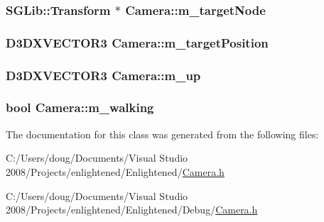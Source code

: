 \hypertarget{class_feisty_1_1_camera_ae903d3ca5f7b7a39409b5f93260540b0}{
\subsubsection[{m\_\-targetNode}]{\setlength{\rightskip}{0pt plus 5cm}SGLib::Transform $\ast$ {\bf Camera::m\_\-targetNode}}}
\label{class_feisty_1_1_camera_ae903d3ca5f7b7a39409b5f93260540b0}
\hypertarget{class_feisty_1_1_camera_a46e0e07b73df0dac52e8dea78f8a931b}{
\subsubsection[{m\_\-targetPosition}]{\setlength{\rightskip}{0pt plus 5cm}D3DXVECTOR3 {\bf Camera::m\_\-targetPosition}}}
\label{class_feisty_1_1_camera_a46e0e07b73df0dac52e8dea78f8a931b}
\hypertarget{class_feisty_1_1_camera_aa5b229f3392f3ad3f9863fdb4965288a}{
\subsubsection[{m\_\-up}]{\setlength{\rightskip}{0pt plus 5cm}D3DXVECTOR3 {\bf Camera::m\_\-up}}}
\label{class_feisty_1_1_camera_aa5b229f3392f3ad3f9863fdb4965288a}
\hypertarget{class_feisty_1_1_camera_aae8a222463783a5f5114ffbc6a22dc91}{
\subsubsection[{m\_\-walking}]{\setlength{\rightskip}{0pt plus 5cm}bool {\bf Camera::m\_\-walking}}}
\label{class_feisty_1_1_camera_aae8a222463783a5f5114ffbc6a22dc91}


The documentation for this class was generated from the following files:\begin{DoxyCompactItemize}
\item 
C:/Users/doug/Documents/Visual Studio 2008/Projects/enlightened/Enlightened/\hyperlink{_camera_8h}{Camera.h}\item 
C:/Users/doug/Documents/Visual Studio 2008/Projects/enlightened/Enlightened/Debug/\hyperlink{_debug_2_camera_8h}{Camera.h}\end{DoxyCompactItemize}
